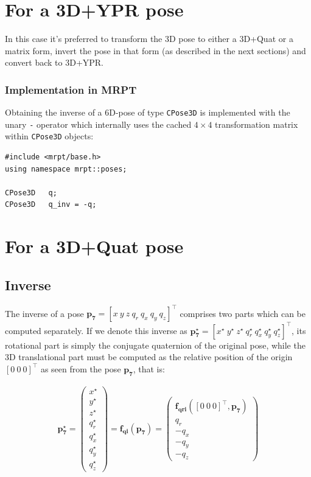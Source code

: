 \documentclass[a4paper,11pt]{report}
\begin{document}
\section{For a 3D+YPR pose}

In this case it's preferred to transform the 3D pose to either a 3D+Quat or a matrix form, 
invert the pose in that form (as described in the next sections) and convert back to 3D+YPR.


\subsubsection{Implementation in MRPT}

Obtaining the inverse of a 6D-pose of type \texttt{CPose3D} is implemented 
with the unary \texttt{-} operator which internally uses the cached $4 \times 4$ 
transformation matrix within \texttt{CPose3D} objects:

\begin{lstlisting}
#include <mrpt/base.h> 
using namespace mrpt::poses; 

CPose3D   q;
CPose3D   q_inv = -q;
\end{lstlisting}




\section{For a 3D+Quat pose}
\label{sect:inverse:quat}

\subsection{Inverse}

The inverse of a pose $\mathbf{p_7} = [x ~ y ~ z ~  q_r ~ q_x ~ q_y ~ q_z ] ^ \top$
comprises two parts which can be computed separately.
If we denote this inverse as $\mathbf{p^\star_7} = [x^\star ~ y^\star ~ z^\star ~  q^\star_r ~ q^\star_x ~ q^\star_y ~ q^\star_z ] ^ \top$,
its rotational part is simply the conjugate quaternion of the original pose, while the 3D translational
part must be computed as the relative position of the origin $[0 ~ 0 ~ 0]^\top$ as seen 
from the pose $\mathbf{p_7}$, that is:

\begin{eqnarray}
\mathbf{p^\star_7} = 
\left(
\begin{array}{c}
x^\star \\ y^\star \\ z^\star \\  q^\star_r \\ q^\star_x \\ q^\star_y \\ q^\star_z
\end{array}
\right) 
= 
\mathbf{f_{qi}}( \mathbf{p_7} ) 
=
\left(
\begin{array}{c}
\mathbf{f_{qri}}( [0 ~ 0 ~ 0]^\top, \mathbf{p_7} ) 
\\  q_r \\ -q_x \\ -q_y \\ -q_z
\end{array}
\right)
\end{eqnarray}
\end{document}
